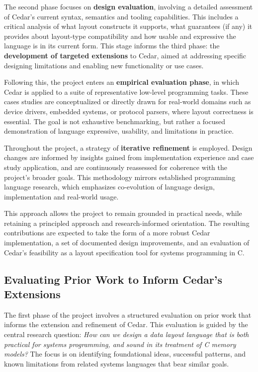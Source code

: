 \documentclass[12pt]{article}
\begin{document}
The second phase focuses on \textbf{design evaluation}, involving a detailed
assessment of Cedar's current syntax, semantics and tooling capabilities. This
includes a critical analysis of what layout constructs it supports, what
guarantees (if any) it provides about layout-type compatibility and how usable
and expressive the language is in its current form. This stage informs
the third phase: the \textbf{development of targeted extensions}  to Cedar,
aimed at addressing specific designing limitations and enabling new functionality
or use cases. 

Following this, the project enters an \textbf{empirical evaluation phase}, in
which Cedar is applied to a suite of representative low-level programming tasks.
These cases studies are conceptualized or directly drawn for real-world
domains such as device drivers, embedded systems, or protocol parsers, where
layout correctness is essential. The goal is not exhaustive benchmarking, but
rather a focused demonstration of language expressive, usability, and
limitations in practice.

Throughout the project, a strategy of \textbf{iterative refinement} is employed.
Design changes are informed by insights gained from implementation experience
and case study application, and are continuously reassessed for coherence with
the project's broader goals. This methodology mirrors established
programming language research, which emphasizes co-evolution of language design,
implementation and real-world usage.

This approach allows the project to remain grounded in practical needs, while
retaining a principled approach and research-informed orientation. The resulting
contributions are expected to take the form of a more robust Cedar
implementation, a set of documented design improvements, and an evaluation of
Cedar's feasibility as a layout specification tool for systems programming in C.

\subsection {Evaluating Prior Work to Inform Cedar's Extensions}
The first phase of the project involves a structured evaluation on prior work
that informs the extension and refinement of Cedar. This evaluation is guided
by the central research question: \textit{How can we design a data layout
language that is both practical for systems programming, and sound in its
treatment of C memory models?} The focus is on identifying foundational ideas,
successful patterns, and known limitations from related systems languages that
bear similar goals.
\end{document}
